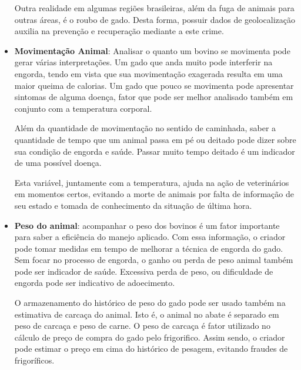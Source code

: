 \documentclass[
    hidelinks,
	12pt,				%
	openany,
	oneside, 
	a4paper,			%
	english,			%
	french,				%
	spanish,			%
	brazil				%
	]{abntex2}
\begin{document}
\begin{itemize}
Outra realidade em algumas regiões brasileiras, além da fuga de animais para outras áreas, é o roubo de gado. Desta forma, possuir dados de geolocalização auxilia na prevenção e recuperação mediante a este crime.

\item \textbf{Movimentação Animal}: Analisar o quanto um bovino se movimenta pode gerar várias interpretações. Um gado que anda muito pode interferir na engorda, tendo em vista que sua movimentação exagerada resulta em uma maior queima de calorias. Um gado que pouco se movimenta pode apresentar sintomas de alguma doença, fator que pode ser melhor analisado também em conjunto com a temperatura corporal.

Além da quantidade de movimentação no sentido de caminhada, saber a quantidade de tempo que um animal passa em pé ou deitado pode dizer sobre sua condição de engorda e saúde. Passar muito tempo deitado é um indicador de uma possível doença.

Esta variável, juntamente com a temperatura, ajuda na ação de veterinários em momentos certos, evitando a morte de animais por falta de informação de seu estado e tomada de conhecimento da situação de última hora.

\item \textbf{Peso do animal}: acompanhar o peso dos bovinos é um fator importante para saber a eficiência do manejo aplicado. Com essa informação, o criador pode tomar medidas em tempo de melhorar a técnica de engorda do gado. Sem focar no processo de engorda, o ganho ou perda de peso animal também pode ser indicador de saúde. Excessiva perda de peso, ou dificuldade de engorda pode ser indicativo de adoecimento.

O armazenamento do histórico de peso do gado pode ser usado também na estimativa de carcaça do animal. Isto é, o animal no abate é separado em peso de carcaça e peso de carne. O peso de carcaça é fator utilizado no cálculo de preço de compra do gado pelo frigorifico. Assim sendo, o criador pode estimar o preço em cima do histórico de pesagem, evitando fraudes de frigoríficos.
\end{itemize}


\end{document}
